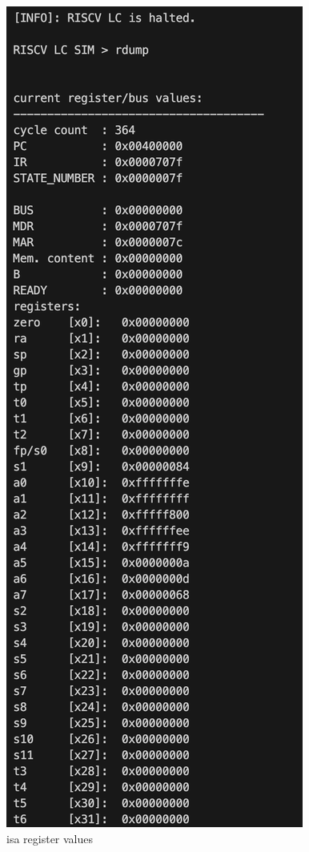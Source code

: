 \documentclass[12pt, a4paper]{article}
\begin{document}
\begin{ans}
    \begin{figure}[H]
        \caption{isa register values}
        \centering
        \includegraphics[scale=0.5]{../figs/isa-rdump.png}
    \end{figure}

\end{ans}
\end{document}
